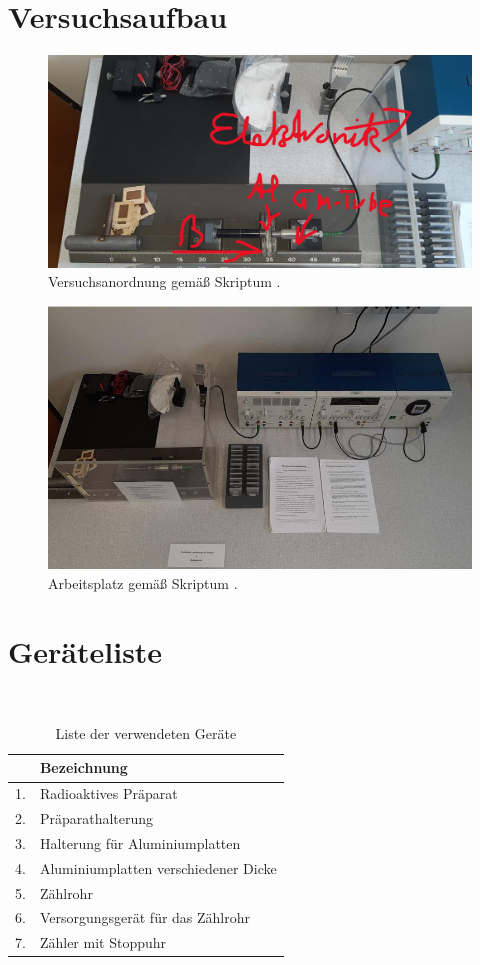 \documentclass{article}
\begin{document}
\section{Versuchsaufbau}


\begin{figure}[H]
\includegraphics[scale=0.5]{aufbau.png}
\caption{Versuchsanordnung gemäß Skriptum \cite{moodle}.}
\end{figure}

\begin{figure}[H]
\includegraphics[scale=1]{aufbau2.png}
\caption{Arbeitsplatz gemäß Skriptum \cite{moodle}.}
\end{figure}



\section{Geräteliste}


\begin{table}[H]
\caption{Liste der verwendeten Geräte}

~

\begin{tabular}{l|l}
&Bezeichnung   \\
\hline
1. & Radioaktives Präparat \\
2. & Präparathalterung \\
3. & Halterung für Aluminiumplatten \\
4. & Aluminiumplatten verschiedener Dicke \\
5. & Zählrohr \\
6. & Versorgungsgerät für das Zählrohr \\
7. & Zähler mit Stoppuhr
\end{tabular}

\end{table}
\end{document}
